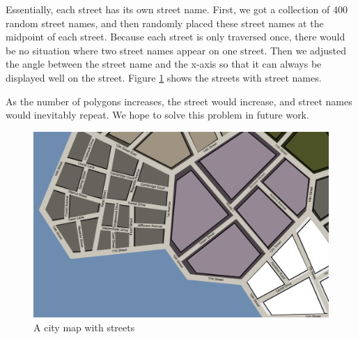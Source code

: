 Essentially, each street has its own street name. First, we got a collection of 400 random street names, and then randomly placed these street names at the midpoint of each street. Because each street is only traversed once, there would be no situation where two street names appear on one street. Then we adjusted the angle between the street name and the x-axis so that it can always be displayed well on the street. Figure \ref{fig:streets} shows the streets with street names.

As the number of polygons increases, the street would increase, and street names would inevitably repeat. We hope to solve this problem in future work.


\begin{figure}[htbp]
  \includegraphics[width=\textwidth]{section04/assets/Map-blocks-streets.png}
  \caption{A city map with streets}
  \label{fig:streets}
\end{figure}

